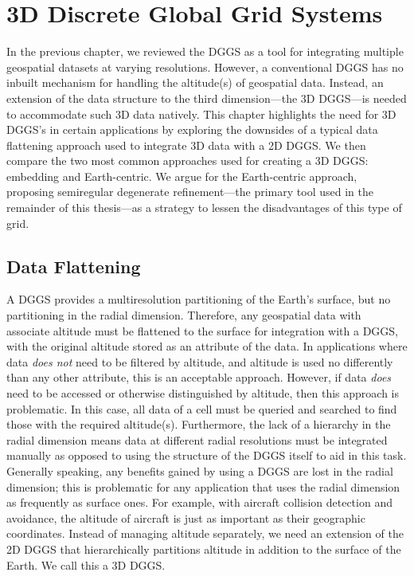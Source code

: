 \chapter{3D Discrete Global Grid Systems} \label{chap:3ddggs}
In the previous chapter, we reviewed the DGGS as a tool for integrating multiple geospatial datasets at varying resolutions.
However, a conventional DGGS has no inbuilt mechanism for handling the altitude(s) of geospatial data.
Instead, an extension of the data structure to the third dimension---the 3D DGGS---is needed to accommodate such 3D data natively.
This chapter highlights the need for 3D DGGS's in certain applications by exploring the downsides of a typical data flattening approach used to integrate 3D data with a 2D DGGS.
We then compare the two most common approaches used for creating a 3D DGGS: embedding and Earth-centric.
We argue for the Earth-centric approach, proposing semiregular degenerate refinement---the primary tool used in the remainder of this thesis---as a strategy to lessen the disadvantages of this type of grid.


\section{Data Flattening} \label{chap:3:flatten}
A DGGS provides a multiresolution partitioning of the Earth's surface, but no partitioning in the radial dimension.
Therefore, any geospatial data with associate altitude must be flattened to the surface for integration with a DGGS, with the original altitude stored as an attribute of the data.
In applications where data \textit{does not} need to be filtered by altitude, and altitude is used no differently than any other attribute, this is an acceptable approach.
However, if data \textit{does} need to be accessed or otherwise distinguished by altitude, then this approach is problematic.
In this case, all data of a cell must be queried and searched to find those with the required altitude(s).
Furthermore, the lack of a hierarchy in the radial dimension means data at different radial resolutions must be integrated manually as opposed to using the structure of the DGGS itself to aid in this task.
Generally speaking, any benefits gained by using a DGGS are lost in the radial dimension; this is problematic for any application that uses the radial dimension as frequently as surface ones.
For example, with aircraft collision detection and avoidance, the altitude of aircraft is just as important as their geographic coordinates.
Instead of managing altitude separately, we need an extension of the 2D DGGS that hierarchically partitions altitude in addition to the surface of the Earth.
We call this a 3D DGGS.


